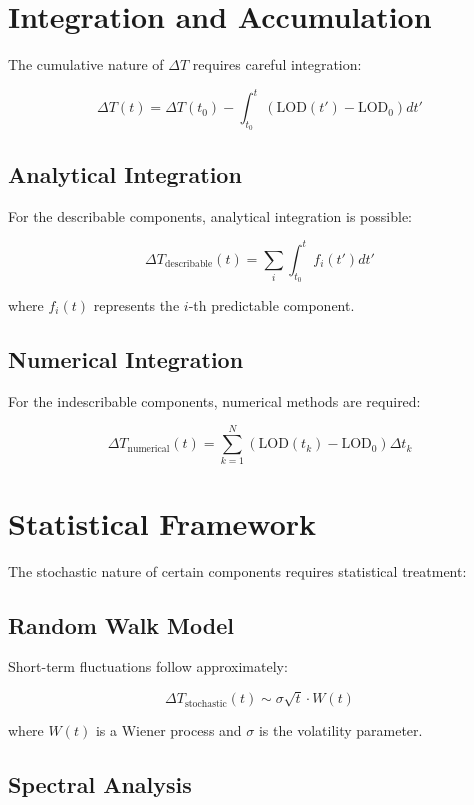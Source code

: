\documentclass[12pt,a4paper]{report}
\begin{document}
\section{Integration and Accumulation}

The cumulative nature of $\Delta T$ requires careful integration:

\[
\Delta T(t) = \Delta T(t_0) - \int_{t_0}^{t} \left(\text{LOD}(t') - \text{LOD}_0\right) dt'
\]

\subsection{Analytical Integration}

For the describable components, analytical integration is possible:

\[
\Delta T_{\text{describable}}(t) = \sum_{i} \int_{t_0}^{t} f_i(t') dt'
\]

where $f_i(t)$ represents the $i$-th predictable component.

\subsection{Numerical Integration}

For the indescribable components, numerical methods are required:

\[
\Delta T_{\text{numerical}}(t) = \sum_{k=1}^{N} \left(\text{LOD}(t_k) - \text{LOD}_0\right) \Delta t_k
\]

\section{Statistical Framework}

The stochastic nature of certain components requires statistical treatment:

\subsection{Random Walk Model}

Short-term fluctuations follow approximately:

\[
\Delta T_{\text{stochastic}}(t) \sim \sigma \sqrt{t} \cdot W(t)
\]

where $W(t)$ is a Wiener process and $\sigma$ is the volatility parameter.

\subsection{Spectral Analysis}
\end{document}
